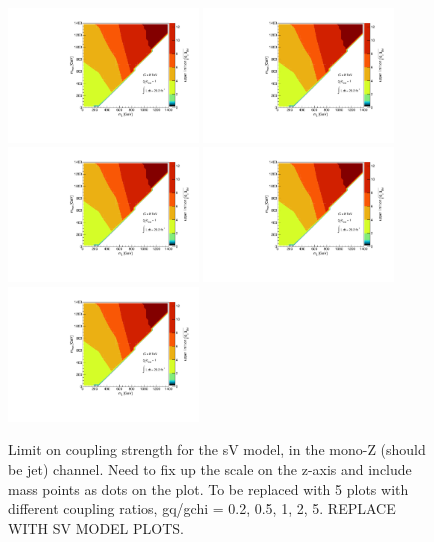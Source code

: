 \begin{figure}
\begin{center}
\includegraphics[width=0.45\textwidth]{figures/coupling_limits_TSD_1.pdf}
\includegraphics[width=0.45\textwidth]{figures/coupling_limits_TSD_1.pdf}
\includegraphics[width=0.45\textwidth]{figures/coupling_limits_TSD_1.pdf}
\includegraphics[width=0.45\textwidth]{figures/coupling_limits_TSD_1.pdf}
\includegraphics[width=0.45\textwidth]{figures/coupling_limits_TSD_1.pdf}
\caption{Limit on coupling strength for the sV model, in the mono-Z (should be jet) channel.  Need to fix up the scale on the z-axis and include mass points as dots on the plot. To be replaced with 5 plots with different coupling ratios, gq/gchi = 0.2, 0.5, 1, 2, 5. REPLACE WITH SV MODEL PLOTS.}
\label{fig:Monojet_SVD_couplinglimit}
\end{center}
\end{figure}

